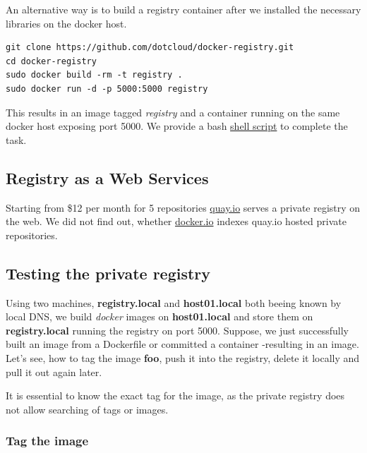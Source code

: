 \documentclass[11pt]{article}
\begin{document}
An alternative way is to build a registry container after we installed the necessary libraries on the docker host.

\begin{verbatim}
git clone https://github.com/dotcloud/docker-registry.git
cd docker-registry
sudo docker build -rm -t registry .
sudo docker run -d -p 5000:5000 registry
\end{verbatim}
This results in an image tagged \emph{registry} and a container running on the same docker host exposing port 5000.
We provide a bash \href{file:///debiandata/michael/elemica/docker/poc-docker-jenkins/registry/buildRegistry.sh}{shell script} to complete the task.
\subsection{Registry as a Web Services}
\label{sec-3-6}

Starting from \$12 per month for 5 repositories \href{https://quay.io/}{quay.io} serves a private registry on the web. We did not find out, whether \href{https://index.docker.io/}{docker.io} indexes quay.io hosted private repositories.
\subsection{Testing the private registry}
\label{sec-3-7}

Using two machines, \textbf{registry.local} and \textbf{host01.local} both beeing known by local DNS, we build \emph{docker} images on \textbf{host01.local} and store them on \textbf{registry.local} running the registry on port 5000.  Suppose, we just successfully built an image from a Dockerfile or committed a container -resulting in an image. Let's see, how to tag the image \textbf{foo}, push it into the registry, delete it locally and pull it out again later. 

It is essential to know the exact tag for the image, as the private registry does not allow searching of tags or images. 
\subsubsection{Tag the image}
\label{sec-3-7-1}
\end{document}
